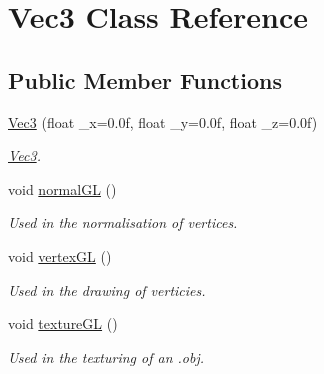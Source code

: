 \hypertarget{classVec3}{\section{Vec3 Class Reference}
\label{classVec3}
}
\subsection*{Public Member Functions}
\begin{DoxyCompactItemize}
\item 
\hyperlink{classVec3_a7cdc21cdb9bc91aaf00b3aae077eab5f}{Vec3} (float \-\_\-x=0.\-0f, float \-\_\-y=0.\-0f, float \-\_\-z=0.\-0f)
\begin{DoxyCompactList}\small\item\em \hyperlink{classVec3}{Vec3}. \end{DoxyCompactList}\item 
\hypertarget{classVec3_a58bdb289aef592de8942d4af8956dc14}{void \hyperlink{classVec3_a58bdb289aef592de8942d4af8956dc14}{normal\-G\-L} ()}\label{classVec3_a58bdb289aef592de8942d4af8956dc14}

\begin{DoxyCompactList}\small\item\em Used in the normalisation of vertices. \end{DoxyCompactList}\item 
\hypertarget{classVec3_a939ff41aa8950141772f6fbe874576b8}{void \hyperlink{classVec3_a939ff41aa8950141772f6fbe874576b8}{vertex\-G\-L} ()}\label{classVec3_a939ff41aa8950141772f6fbe874576b8}

\begin{DoxyCompactList}\small\item\em Used in the drawing of verticies. \end{DoxyCompactList}\item 
\hypertarget{classVec3_a8ae14845b6593f9753a5a1cdd4bbedc7}{void \hyperlink{classVec3_a8ae14845b6593f9753a5a1cdd4bbedc7}{texture\-G\-L} ()}\label{classVec3_a8ae14845b6593f9753a5a1cdd4bbedc7}

\begin{DoxyCompactList}\small\item\em Used in the texturing of an .obj. \end{DoxyCompactList}\end{DoxyCompactItemize}
